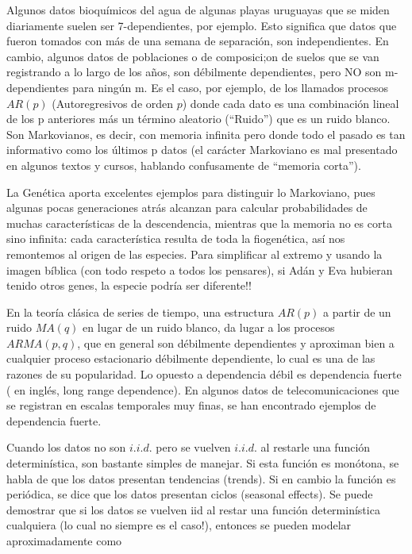 \documentclass[
  oneside]{book}
\begin{document}
Algunos datos bioquímicos del agua de algunas playas uruguayas que se
miden diariamente suelen ser 7-dependientes, por ejemplo. Esto significa
que datos que fueron tomados con más de una semana de separación, son
independientes. En cambio, algunos datos de poblaciones o de
composici;on de suelos que se van registrando a lo largo de los años,
son débilmente dependientes, pero NO son m-dependientes para ningún m.
Es el caso, por ejemplo, de los llamados procesos \(AR(p)\)
(Autoregresivos de orden \(p\)) donde cada dato es una combinación
lineal de los p anteriores más un término aleatorio (``Ruido'') que es
un ruido blanco. Son Markovianos, es decir, con memoria infinita pero
donde todo el pasado es tan informativo como los últimos p datos (el
carácter Markoviano es mal presentado en algunos textos y cursos,
hablando confusamente de ``memoria corta'').

La Genética aporta excelentes ejemplos para distinguir lo Markoviano,
pues algunas pocas generaciones atrás alcanzan para calcular
probabilidades de muchas características de la descendencia, mientras
que la memoria no es corta sino infinita: cada característica resulta de
toda la fiogenética, así nos remontemos al origen de las especies. Para
simplificar al extremo y usando la imagen bíblica (con todo respeto a
todos los pensares), si Adán y Eva hubieran tenido otros genes, la
especie podría ser diferente!!

En la teoría clásica de series de tiempo, una estructura \(AR(p)\) a
partir de un ruido \(MA(q)\) en lugar de un ruido blanco, da lugar a los
procesos \(ARMA (p,q)\), que en general son débilmente dependientes y
aproximan bien a cualquier proceso estacionario débilmente dependiente,
lo cual es una de las razones de su popularidad. Lo opuesto a
dependencia débil es dependencia fuerte ( en inglés, long range
dependence). En algunos datos de telecomunicaciones que se registran en
escalas temporales muy finas, se han encontrado ejemplos de dependencia
fuerte.

Cuando los datos no son \(i.i.d.\) pero se vuelven \(i.i.d.\) al
restarle una función determinística, son bastante simples de manejar. Si
esta función es monótona, se habla de que los datos presentan tendencias
(trends). Si en cambio la función es periódica, se dice que los datos
presentan ciclos (seasonal effects). Se puede demostrar que si los datos
se vuelven iid al restar una función determinística cualquiera (lo cual
no siempre es el caso!), entonces se pueden modelar aproximadamente como
\end{document}
